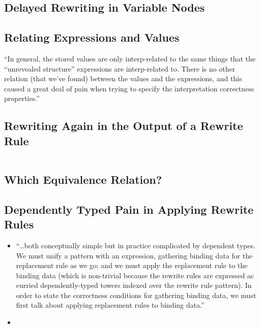 \subsection{Delayed Rewriting in Variable Nodes}

\subsection{Relating Expressions and Values}
``In general, the stored values are only interp-related to the same things that the ``unrevealed structure'' expressions are interp-related to. There is no other relation (that we've found) between the values and the expressions, and this caused a great deal of pain when trying to specify the interpretation correctness properties.''

\subsection{Rewriting Again in the Output of a Rewrite Rule}
$\left.\right.$
\subsection{Which Equivalence Relation?}

\subsection{Dependently Typed Pain in Applying Rewrite Rules}
\begin{itemize}
\item {}
``\ldots\space both conceptually simple but in practice complicated by dependent types.
We must unify a pattern with an expression, gathering binding data for the replacement rule as we go; and we must apply the replacement rule to the binding data (which is non-trivial because the rewrite rules are expressed as curried dependently-typed towers indexed over the rewrite rule pattern).
In order to state the correctness conditions for gathering binding data, we must first talk about applying replacement rules to binding data.''
\item {}
\end{itemize}

